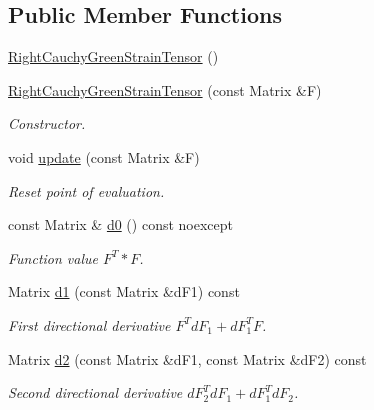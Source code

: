 \subsection*{\-Public \-Member \-Functions}
\begin{DoxyCompactItemize}
\item 
\hyperlink{classFunG_1_1LinearAlgebra_1_1RightCauchyGreenStrainTensor_abac64f090e70aeb191089696253d4c67}{\-Right\-Cauchy\-Green\-Strain\-Tensor} ()
\item 
\hyperlink{classFunG_1_1LinearAlgebra_1_1RightCauchyGreenStrainTensor_af6085878319f95c8dbe40a6b0de17eb1}{\-Right\-Cauchy\-Green\-Strain\-Tensor} (const \-Matrix \&\-F)
\begin{DoxyCompactList}\small\item\em \-Constructor. \end{DoxyCompactList}\item 
void \hyperlink{classFunG_1_1LinearAlgebra_1_1RightCauchyGreenStrainTensor_a4517ded8eaf56f040f415b8776dd64a8}{update} (const \-Matrix \&\-F)
\begin{DoxyCompactList}\small\item\em \-Reset point of evaluation. \end{DoxyCompactList}\item 
const \-Matrix \& \hyperlink{classFunG_1_1LinearAlgebra_1_1RightCauchyGreenStrainTensor_a237357e50d543196ed0228588e911665}{d0} () const noexcept
\begin{DoxyCompactList}\small\item\em \-Function value $ F^T * F $. \end{DoxyCompactList}\item 
\-Matrix \hyperlink{classFunG_1_1LinearAlgebra_1_1RightCauchyGreenStrainTensor_ae8746d06ba0d2a127f7775b03d0890a7}{d1} (const \-Matrix \&d\-F1) const 
\begin{DoxyCompactList}\small\item\em \-First directional derivative $ F^T dF_1 + dF_1^T F $. \end{DoxyCompactList}\item 
\-Matrix \hyperlink{classFunG_1_1LinearAlgebra_1_1RightCauchyGreenStrainTensor_a9244629a9ae616c0938e95fbdf68a7d5}{d2} (const \-Matrix \&d\-F1, const \-Matrix \&d\-F2) const 
\begin{DoxyCompactList}\small\item\em \-Second directional derivative $ dF_2^T dF_1 + dF_1^T dF_2 $. \end{DoxyCompactList}\end{DoxyCompactItemize}



